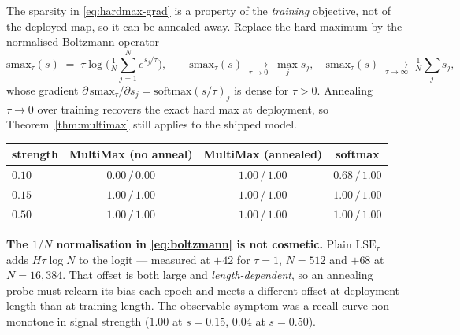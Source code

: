 \begin{remark}
\label{rem:annealing}
The sparsity in \eqref{eq:hardmax-grad} is a property of the \emph{training} objective,
not of the deployed map, so it can be annealed away. Replace the hard maximum by the
normalised Boltzmann operator
\begin{equation}
  \mathrm{smax}_\tau(s)
  \;=\;\tau\log\!\Big(\tfrac{1}{N}\textstyle\sum_{j=1}^{N} e^{s_j/\tau}\Big),
  \qquad
  \mathrm{smax}_\tau(s)\;\xrightarrow[\tau\to 0]{}\;\max_j s_j,
  \quad
  \mathrm{smax}_\tau(s)\;\xrightarrow[\tau\to\infty]{}\;\tfrac1N\textstyle\sum_j s_j,
  \label{eq:boltzmann}
\end{equation}
whose gradient $\partial\,\mathrm{smax}_\tau/\partial s_j=\mathrm{softmax}(s/\tau)_j$ is
dense for $\tau>0$. Annealing $\tau\to 0$ over training recovers the exact hard max at
deployment, so Theorem~\ref{thm:multimax} still applies to the shipped model.

\begin{center}
\begin{tabular}{lccc}
\hline
strength & MultiMax (no anneal) & MultiMax (annealed) & softmax \\
\hline
$0.10$ & $0.00\,/\,0.00$ & $\mathbf{1.00\,/\,1.00}$ & $0.68\,/\,1.00$\\
$0.15$ & $1.00\,/\,1.00$ & $1.00\,/\,1.00$ & $1.00\,/\,1.00$\\
$0.50$ & $1.00\,/\,1.00$ & $1.00\,/\,1.00$ & $1.00\,/\,1.00$\\
\hline
\end{tabular}
\end{center}

\textbf{The $1/N$ normalisation in \eqref{eq:boltzmann} is not cosmetic.} Plain
$\mathrm{LSE}_\tau$ adds $H\tau\log N$ to the logit --- measured at $+42$ for $\tau=1$,
$N=512$ and $+68$ at $N=16{,}384$. That offset is both large and \emph{length-dependent},
so an annealing probe must relearn its bias each epoch and meets a different offset at
deployment length than at training length. The observable symptom was a recall curve
non-monotone in signal strength ($1.00$ at $s=0.15$, $0.04$ at $s=0.50$).
\end{remark}

